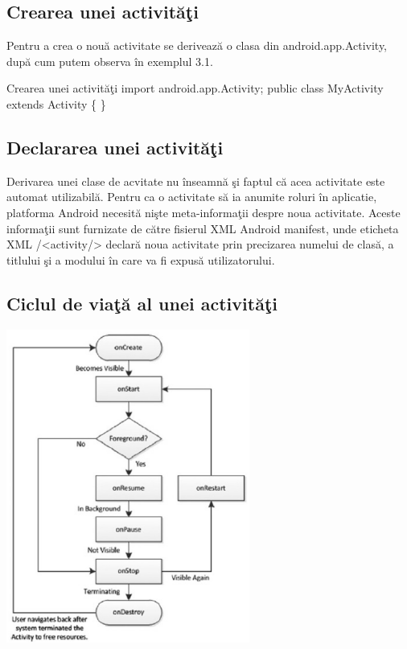 \subsection{Crearea unei activit\u a\c ti}
Pentru a crea o nou\u a activitate se deriveaz\u a o clasa din android.app.Activity, dup\u a cum putem observa \^in exemplul 3.1.\cite{3}\newline 

\begin{exmp} Crearea unei activit\u a\c ti\newline 
import android.app.Activity;\newline 
public class MyActivity extends Activity \{\newline 
\}\end{exmp}

\subsection{Declararea unei activit\u a\c ti}
Derivarea unei clase de acvitate nu \^inseamn\u a \c si faptul c\u a acea activitate este automat utilizabil\u a. Pentru ca o activitate s\u a ia anumite roluri \^in aplicatie, platforma Android necesit\u a ni\c ste meta-informa\c tii despre noua activitate. Aceste informa\c tii sunt furnizate de c\u atre fisierul XML Android manifest, unde eticheta XML /<activity/> declar\u a noua activitate prin precizarea numelui de clas\u a, a titlului \c si a modului \^in care va fi expus\u a utilizatorului.\cite{1}\newpage

\subsection{Ciclul de via\c t\u a al unei activit\u a\c ti}\cite{1}

\begin{center}
\includegraphics[width=0.6\textwidth]{imagini/activity.eps}
\end{center}

